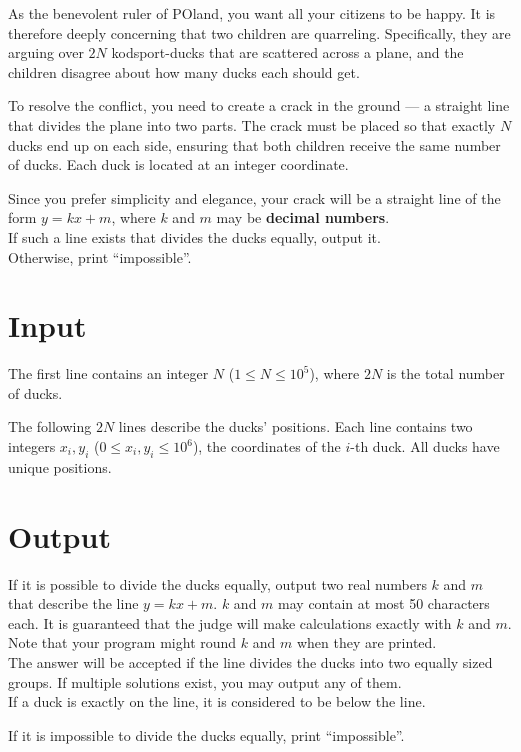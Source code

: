 \noindent

As the benevolent ruler of POland, you want all your citizens to be happy. 
It is therefore deeply concerning that two children are quarreling. 
Specifically, they are arguing over $2N$ kodsport-ducks that are scattered 
across a plane, and the children disagree about how many ducks each should get.

To resolve the conflict, you need to create a crack in the ground — a straight 
line that divides the plane into two parts. The crack must be placed so that 
exactly $N$ ducks end up on each side, ensuring that both children receive 
the same number of ducks. Each duck is located at an integer coordinate.

Since you prefer simplicity and elegance, your crack will be a straight line of the form $y = kx + m$, where $k$ and $m$ may be \textbf{decimal numbers}.\\
If such a line exists that divides the ducks equally, output it.\\
Otherwise, print ``impossible''.

\section*{Input}
The first line contains an integer $N$ ($1 \leq N \leq 10^5$), where $2N$ is the total number of ducks.

The following $2N$ lines describe the ducks' positions. Each line contains two integers $x_i, y_i$ ($0 \leq x_i, y_i \leq 10^6$), the coordinates of the $i$-th duck.
All ducks have unique positions.

\section*{Output}
If it is possible to divide the ducks equally, output two real numbers $k$ and $m$ that describe the line $y = kx + m$.
$k$ and $m$ may contain at most 50 characters each. It is guaranteed that the judge will make calculations exactly with $k$ and $m$.
Note that your program might round $k$ and $m$ when they are printed. \\
The answer will be accepted if the line divides the ducks into two equally sized groups. If multiple solutions exist, you may output any of them.\\
If a duck is exactly on the line, it is considered to be below the line.

If it is impossible to divide the ducks equally, print ``impossible''.

